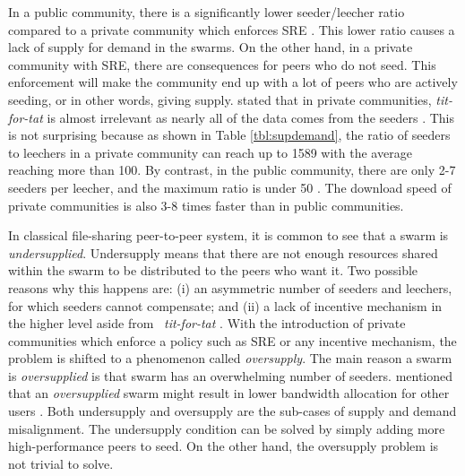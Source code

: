 In a public community, there is a significantly lower seeder/leecher ratio compared to a private community which enforces SRE \cite{2010:pubpriv:meulpolder,2009:demandsupplyres:andrade}. This lower ratio causes a lack of supply for demand in the swarms. On the other hand, in a private community with SRE, there are consequences for peers who do not seed. This enforcement will make the community end up with a lot of peers who are actively seeding, or in other words, giving supply. \citeauthor{2010:pubpriv:meulpolder} stated that in private communities, \textit{tit-for-tat} is almost irrelevant as nearly all of the data comes from the seeders \cite{2010:pubpriv:meulpolder}. This is not surprising because as shown in Table \ref{tbl:supdemand}, the ratio of seeders to leechers in a private community can reach up to 1589 with the average reaching more than 100. By contrast, in the public community, there are only 2-7 seeders per leecher, and the maximum ratio is under 50 \cite{2010:pubpriv:meulpolder}. The download speed of private communities is also 3-8 times faster than in public communities. 

In classical file-sharing peer-to-peer system, it is common to see that a swarm is \textit{undersupplied}. Undersupply means that there are not enough resources shared within the swarm to be distributed to the peers who want it. Two possible reasons why this happens are: (i) an asymmetric number of seeders and leechers, for which seeders cannot compensate; and (ii) a lack of incentive mechanism in the higher level aside from \bt~\textit{tit-for-tat} \cite{2009:demandsupplyres:andrade}. With the introduction of private communities which enforce a policy such as SRE or any incentive mechanism, the problem is shifted to a phenomenon called \textit{oversupply}. The main reason a swarm is \textit{oversupplied} is that swarm has an overwhelming number of seeders. \citeauthor{2013:survivepriv:jia} mentioned that an \textit{oversupplied} swarm might result in lower bandwidth allocation for other users \cite{2013:survivepriv:jia}. Both undersupply and oversupply are the sub-cases of supply and demand misalignment. The undersupply condition can be solved by simply adding more high-performance peers to seed. On the other hand, the oversupply problem is not trivial to solve.

